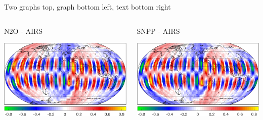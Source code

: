 \documentclass[10pt,t]{beamer}
\begin{document}
\begin{frame}[label={sec:org791e503}]{Two graphs top, graph bottom left, text bottom right}
  \vspace{-0.3in}
  \begin{columns}
    \begin{column}{0.55\columnwidth}
      \begin{block}{\footnotesize N2O - AIRS}
        \vspace{-0.05in}
        \vspace{-0.05in}
        \begin{center}
          \includegraphics[width=0.95\linewidth]{./testfig.png}
        \end{center}
      \end{block}
    \end{column}

    \begin{column}{0.55\columnwidth}
      \begin{block}{\footnotesize SNPP - AIRS}
        \vspace{-0.05in}
        \vspace{-0.05in}
        \begin{center}
          \includegraphics[width=0.95\linewidth]{./testfig.png}
        \end{center}
      \end{block}
    \end{column}
  \end{columns}


\end{frame}
\end{document}
